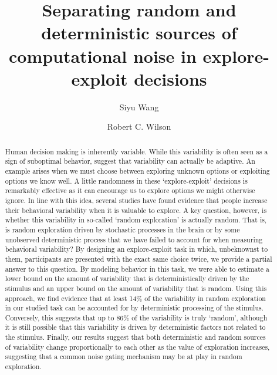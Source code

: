 \documentclass[12pt]{article}
\title{Separating random and deterministic sources of computational noise in explore-exploit decisions}
\author[1]{Siyu Wang}%
\author[1,2,3]{Robert C. Wilson}
\affil[1]{Department of Psychology, University of Arizona, Tucson AZ, USA}
\affil[2]{Neuroscience and Physiological Sciences Graduate Interdisciplinary Program, University of
	Arizona, Tucson AZ, USA}
\affil[3]{Cognitive Science Program, University of Arizona, Tucson AZ, USA}
\begin{document}
	\maketitle
	
	\newpage
	\begin{abstract}
		Human decision making is inherently variable. While this variability is often seen as a sign of suboptimal behavior,  suggest that variability can actually be adaptive. An example arises when we must choose between exploring unknown options or exploiting options we know well. A little randomness in these `explore-exploit' decisions is remarkably effective as it can encourage us to explore options we might otherwise ignore. In line with this idea, several studies have found evidence that people increase their behavioral variability when it is valuable to explore. A key question, however, is whether this variability in so-called `random exploration' is actually random. That is, is random exploration driven by stochastic processes in the brain or by some unobserved deterministic process that we have failed to account for when measuring behavioral variability? By designing an explore-exploit task in which, unbeknownst to them, participants are presented with the exact same choice twice, we provide a partial answer to this question. By modeling behavior in this task, we were able to estimate a lower bound on the amount of variability that is deterministically driven by the stimulus and an upper bound on the amount of variability that is random. Using this approach, we find evidence that at least 14$\%$ of the variability in random exploration in our studied task can be accounted for by deterministic processing of the stimulus. Conversely, this suggests that up to 86$\%$ of the variability is truly `random', although it is still possible that this variability is driven by deterministic factors not related to the stimulus. Finally, our results suggest that both deterministic and random sources of variability change proportionally to each other as the value of exploration increases, suggesting that a common noise gating mechanism may be at play in random exploration.		
	\end{abstract}

	\newpage
\end{document}
